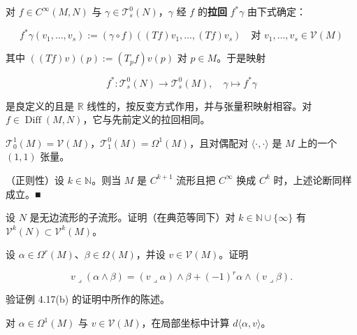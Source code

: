 \begin{remark}
\begin{items}
对 $ f \in C^\infty(M, N) $ 与 $ \gamma \in \mathcal{T}_s^0(N) $，$ \gamma $ 经 $ f $ 的\textbf{拉回} $ f^*\gamma $ 由下式确定：

\[
f^*\gamma(v_1, \ldots, v_s) := (\gamma \circ f)((Tf)v_1, \ldots, (Tf)v_s) \quad \text{对 } v_1, \ldots, v_s \in \mathcal{V}(M)
\]

其中 $ ((Tf)v)(p) := (T_p f)v(p) $ 对 $ p \in M $。于是映射

\[
f^*: \mathcal{T}_s^0(N) \to \mathcal{T}_s^0(M), \quad \gamma \mapsto f^*\gamma
\]

是良定义的且是 $ \mathbb{R} $ 线性的，按反变方式作用，并与张量积映射相容。对 $ f \in \operatorname{Diff}(M, N) $，它与先前定义的拉回相同。

\item

$ \mathcal{T}_0^1(M) = \mathcal{V}(M) $，$ \mathcal{T}_1^0(M) = \Omega^1(M) $，且对偶配对 $ \langle \cdot, \cdot \rangle $ 是 $ M $ 上的一个 $ (1, 1) $ 张量。

\item

（正则性）设 $ k \in \mathbb{N} $。则当 $ M $ 是 $ C^{k+1} $ 流形且把 $ C^\infty $ 换成 $ C^k $ 时，上述论断同样成立。\nobreak\hspace{0.35em}■

\end{items}

\end{remark}

\exerciseshead

\begin{exercises}
\item

设 $ N $ 是无边流形的子流形。证明（在典范等同下）对 $ k \in \mathbb{N} \cup \{\infty\} $ 有 $ \mathcal{V}^k(N) \subset \mathcal{V}^k(M) $。

\item

设 $ \alpha \in \Omega^r(M) $、$ \beta \in \Omega(M) $，并设 $ v \in \mathcal{V}(M) $。证明

\[
v \lrcorner (\alpha \wedge \beta) = (v \lrcorner \alpha) \wedge \beta + (-1)^r \alpha \wedge (v \lrcorner \beta) .
\]
\item

验证例 4.17(b) 的证明中所作的陈述。

\item

对 $ \alpha \in \Omega^1(M) $ 与 $ v \in \mathcal{V}(M) $，在局部坐标中计算 $ d\langle \alpha, v \rangle $。

\end{exercises}

